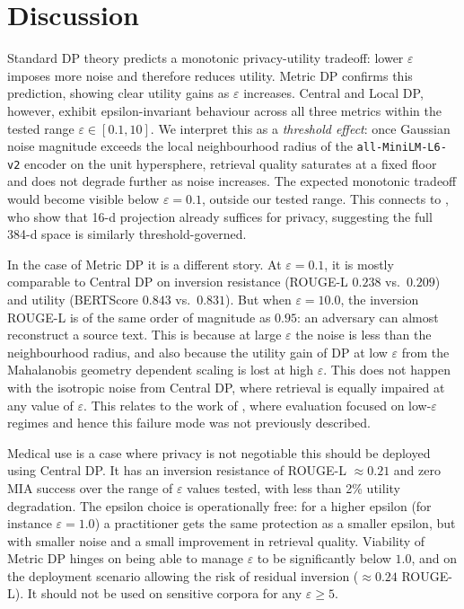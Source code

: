 \documentclass[11pt, a4paper]{article}
\begin{document}
\section{Discussion}

\label{sec:discussion}
Standard DP theory predicts a monotonic privacy-utility tradeoff: lower $\varepsilon$ imposes more noise and therefore reduces utility. Metric DP confirms this prediction, showing clear utility gains as $\varepsilon$ increases. Central and Local DP, however, exhibit epsilon-invariant behaviour across all three metrics within the tested range $\varepsilon \in [0.1, 10]$. We interpret this as a \emph{threshold effect}: once Gaussian noise magnitude exceeds the local neighbourhood radius of the \texttt{all-MiniLM-L6-v2} encoder on the unit hypersphere, retrieval quality saturates at a fixed floor and does not degrade further as noise increases. The expected monotonic tradeoff would become visible below $\varepsilon = 0.1$, outside our tested range. This connects to \citet{du2023sanitizing}, who show that 16-d projection already suffices for privacy, suggesting the full 384-d space is similarly threshold-governed.

In the case of Metric DP it is a different story. At $\varepsilon=0.1$, it is mostly comparable to Central DP on inversion resistance (ROUGE-L $0.238$ vs.\ $0.209$) and utility (BERTScore $0.843$ vs.\ $0.831$). But when $\varepsilon=10.0$, the inversion ROUGE-L is of the same order of magnitude as $0.95$: an adversary can almost reconstruct a source text. This is because at large $\varepsilon$ the noise is less than the neighbourhood radius, and also because the utility gain of DP at low $\varepsilon$ from the Mahalanobis geometry dependent scaling is lost at high $\varepsilon$. This does not happen with the isotropic noise from Central DP, where retrieval is equally impaired at any value of $\varepsilon$. This relates to the work of \citet{bollegala2025cmag}, where evaluation focused on low-$\varepsilon$ regimes and hence this failure mode was not previously described.

Medical use is a case where privacy is not negotiable   this should be deployed using Central DP. It has an inversion resistance of ROUGE-L $\approx 0.21$ and zero MIA success over the range of $\varepsilon$ values tested, with less than 2\% utility degradation. The epsilon choice is operationally free: for a higher epsilon (for instance $\varepsilon=1.0$) a practitioner gets the same protection as a smaller epsilon, but with smaller noise and a small improvement in retrieval quality. Viability of Metric DP hinges on being able to manage $\varepsilon$ to be significantly below $1.0$, and on the deployment scenario allowing the risk of residual inversion ($\approx 0.24$ ROUGE-L). It should not be used on sensitive corpora for any $\varepsilon \geq 5$.
\end{document}
